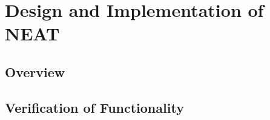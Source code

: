 
\section{Design and Implementation of NEAT}
\subsection{Overview}
\subsection{Verification of Functionality}
